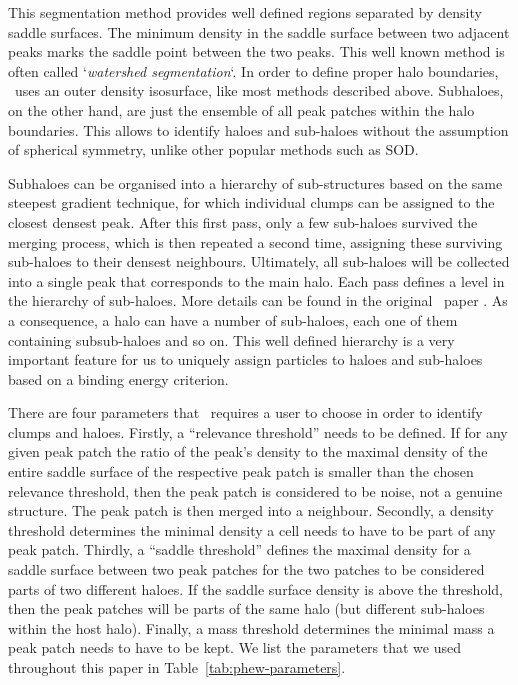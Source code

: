 This segmentation method provides well defined regions separated by
density saddle surfaces. The minimum density in the saddle surface
between two adjacent peaks marks the saddle point between the two
peaks.  This well known method is often called `\emph{watershed
segmentation}`. In order to define proper halo boundaries, \phew\ uses
an outer density isosurface, like most methods described
above. Subhaloes, on the other hand, are just the ensemble of all
peak patches within the halo boundaries. This allows to identify
haloes and sub-haloes without the assumption of spherical symmetry,
unlike other popular methods such as SOD.

Subhaloes can be organised into a hierarchy of sub-structures based
on the same steepest gradient technique, for which individual clumps
can be assigned to the closest densest peak.  After this first pass,
only a few sub-haloes survived the merging process, which is then
repeated a second time, assigning these surviving sub-haloes to their
densest neighbours.  Ultimately, all sub-haloes will be collected into
a single peak that corresponds to the main halo. Each pass defines a
level in the hierarchy of sub-haloes. More details can be found in the
original \phew\ paper \citep{bleulerPHEWParallelSegmentation2015}.
As a consequence, a halo can have
a number of sub-haloes, each one of them containing subsub-haloes and
so on.  This well defined hierarchy is a very important feature for us
to uniquely assign particles to haloes and sub-haloes based on a
binding energy criterion.

There are four parameters that \phew\ requires a user to choose in
order to identify clumps and haloes.  Firstly, a ``relevance
threshold'' needs to be defined.  If for any given peak patch the
ratio of the peak's density to the maximal density of the entire
saddle surface of the respective peak patch is smaller than the chosen
relevance threshold, then the peak patch is considered to be noise,
not a genuine structure.  The peak patch is then merged into a
neighbour.  Secondly, a density threshold determines the minimal
density a cell needs to have to be part of any peak patch.  Thirdly, a
``saddle threshold'' defines the maximal density for a saddle surface
between two peak patches for the two patches to be considered parts of
two different haloes.  If the saddle surface density is above the
threshold, then the peak patches will be parts of the same halo (but
different sub-haloes within the host halo).  Finally, a mass threshold
determines the minimal mass a peak patch needs to have to be kept.  We
list the parameters that we used throughout this paper in Table~\ref{tab:phew-parameters}.

